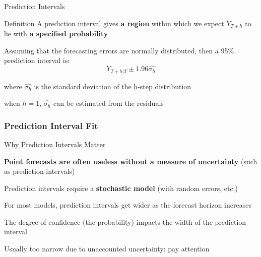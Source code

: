 \documentclass{beamer}
\newenvironment{wideitemize}{\itemize\addtolength{\itemsep}{10pt}}{\enditemize}
\begin{document}
\begin{frame}{Prediction Intervals}
  \begin{block}{Definition}
      A prediction interval gives \textbf{a region} within which we expect $Y_{T+h}$ to lie with \textbf{a specified probability}
  \end{block}

\medskip
  
  \begin{wideitemize}
  \item Assuming that the forecasting errors are normally distributed, then a 95\% prediction interval is:
    \begin{equation*}
      Y_{T+h|T} \pm 1.96 \hat{\sigma_h}
    \end{equation*}
  \item where $\hat{\sigma_h}$ is the standard deviation of the h-step distribution
  \item when $h=1$, $\hat{\sigma_h}$ can be estimated from the residuals  
  \end{wideitemize}  
\end{frame}


\begin{frame}
  \frametitle{Prediction Interval Fit}
\end{frame}


\begin{frame}{Why Prediction Intervals Matter}
  \begin{wideitemize}
    \item \textbf{Point forecasts are often useless without a measure of uncertainty} (such as prediction intervals)
    \item Prediction intervals require a \textbf{stochastic model} (with random errors, etc.)
    \item For most models, prediction intervals get wider as the forecast horizon increases
    \item The degree of confidence (the probability) impacts the width of the prediction interval
    \item Usually too narrow due to unaccounted uncertainty: pay attention
  \end{wideitemize}  
\end{frame}
\end{document}
